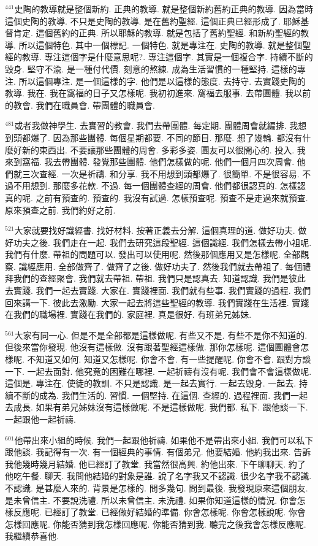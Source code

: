\documentclass{book}
\begin{document}
$^{441}$史陶的教導就是整個新約.
正典的教導.
就是整個新約舊約正典的教導.
因為當時這個史陶的教導.
不只是史陶的教導.
是在舊約聖經.
這個正典已經形成了.
耶穌基督肯定.
這個舊約的正典.
所以耶穌的教導.
就是包括了舊約聖經.
和新約聖經的教導.
所以這個特色.
其中一個標記.
一個特色.
就是專注在.
史陶的教導.
就是整個聖經的教導.
專注這個字是什麼意思呢?.
專注這個字.
其實是一個複合字.
持續不斷的毀身.
堅守不渝.
是一種付代價.
刻意的熬練.
成為生活習慣的一種堅持.
這樣的專注.
所以這個專注.
是一個這樣的字.
他們是以這樣的態度.
去持守.
去實踐史陶的教導.
我在.
我在窩福的日子又怎樣呢.
我初初進來.
窩福去服事.
去帶團體.
我以前的教會.
我們在職員會.
帶團體的職員會.

$^{481}$或者我做神學生.
去實習的教會.
我們去帶團體.
每定期.
團體周會就編排.
我想到頭都爆了.
因為那些團體.
每個星期都要.
不同的節目.
那麼.
想了幾輪.
都沒有什麼好新的東西出.
不要讓那些團體的周會.
多彩多姿.
團友可以很開心的.
投入.
我來到窩福.
我去帶團體.
發覺那些團體.
他們怎樣做的呢.
他們一個月四次周會.
他們就三次查經.
一次是祈禱.
和分享.
我不用想到頭都爆了.
很簡單.
不是很容易.
不過不用想到.
那麼多花款.
不過.
每一個團體查經的周會.
他們都很認真的.
怎樣認真的呢.
之前有預查的.
預查的.
我沒有試過.
怎樣預查呢.
預查不是走過來就預查.
原來預查之前.
我們約好之前.

$^{521}$大家就要找好識經書.
找好材料.
按著正義去分解.
這個真理的道.
做好功夫.
做好功夫之後.
我們走在一起.
我們去研究這段聖經.
這個識經.
我們怎樣去帶小祖呢.
我們有什麼.
帶祖的問題可以.
發出可以使用呢.
然後那個應用又是怎樣呢.
全部觀察.
識經應用.
全部做齊了.
做齊了之後.
做好功夫了.
然後我們就去帶祖了.
每個禮拜我們的查經聚會.
我們就去帶祖.
帶祖.
我們只是認真去.
知道認識.
我們是彼此去實踐.
我們一起去實踐.
大家在.
實踐裡面.
我們就有些事.
我們實踐的過程.
我們回來講一下.
彼此去激勵.
大家一起去將這些聖經的教導.
我們實踐在生活裡.
實踐在我們的職場裡.
實踐在我們的.
家庭裡.
真是很好.
有班弟兄姊妹.

$^{561}$大家有同一心.
但是不是全部都是這樣做呢.
有些又不是.
有些不是你不知道的.
但後來當你發現.
他沒有這樣做.
沒有跟著聖經這樣做.
那你怎樣呢.
這個團體會怎樣呢.
不知道又如何.
知道又怎樣呢.
你會不會.
有一些提醒呢.
你會不會.
跟對方談一下.
一起去面對.
他究竟的困難在哪裡.
一起祈禱有沒有呢.
我們會不會這樣做呢.
這個是.
專注在.
使徒的教訓.
不只是認識.
是一起去實行.
一起去毀身.
一起去.
持續不斷的成為.
我們生活的.
習慣.
一個堅持.
在這個.
查經的.
過程裡面.
我們一起去成長.
如果有弟兄姊妹沒有這樣做呢.
不是這樣做呢.
我們都.
私下.
跟他談一下.
一起跟他一起祈禱.

$^{601}$他帶出來小組的時候.
我們一起跟他祈禱.
如果他不是帶出來小組.
我們可以私下跟他談.
我記得有一次.
有一個經典的事情.
有個弟兄.
他要結婚.
他約我出來.
告訴我他幾時幾月結婚.
他已經訂了教堂.
我當然很高興.
約他出來.
下午聊聊天.
約了他吃午餐.
聊天.
我問他結婚的對象是誰.
說了名字我又不認識.
很少名字我不認識.
不認識.
是甚麼人來的.
背景是怎樣的.
問多幾句.
問到最後.
我發現原來這個朋友.
是未曾信主.
不要說洗禮.
所以未曾信主.
未洗禮.
如果你知道這樣的情況.
你會怎樣反應呢.
已經訂了教堂.
已經做好結婚的準備.
你會怎樣呢.
你會怎樣說呢.
你會怎樣回應呢.
你能否猜到我怎樣回應呢.
你能否猜到我.
聽完之後我會怎樣反應呢.
我繼續恭喜他.
\end{document}
